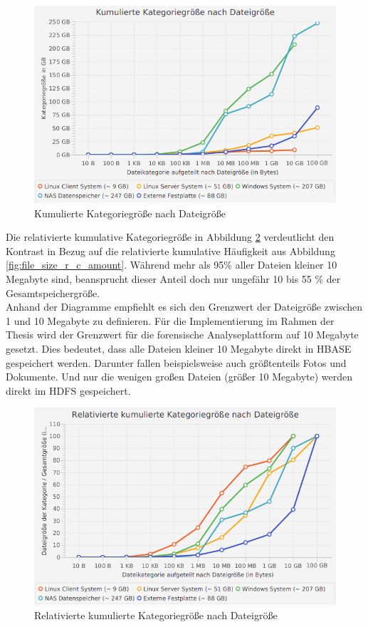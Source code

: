  \begin{figure}[ht]
  \centering
  \includegraphics[width=\textwidth]{./resource/fileSize_cumulatedCategorieSize.png}
  \caption{Kumulierte Kategoriegröße nach Dateigröße}
  \label{fig:file_size_c_file_size}
\end{figure}

\noindent
Die relativierte kumulative Kategoriegröße in Abbildung \ref{fig:file_size_r_c_file_size} verdeutlicht den Kontrast in Bezug auf die relativierte kumulative Häufigkeit aus Abbildung \ref{fig:file_size_r_c_amount}. Während mehr als 95\% aller Dateien kleiner 10 Megabyte sind, beansprucht dieser Anteil doch nur ungefähr 10 bis 55 \% der Gesamtspeichergröße.\\

\noindent
Anhand der Diagramme empfiehlt es sich den Grenzwert der Dateigröße zwischen 1 und 10 Megabyte zu definieren. Für die Implementierung im Rahmen der Thesis wird der Grenzwert für die forensische Analyseplattform auf 10 Megabyte gesetzt. Dies bedeutet, dass alle Dateien kleiner 10 Megabyte direkt in HBASE gespeichert werden. Darunter fallen beispielsweise auch größtenteils Fotos und Dokumente. Und nur die wenigen großen Dateien (größer 10 Megabyte) werden direkt im HDFS gespeichert.  

 \begin{figure}[ht]
  \centering
  \includegraphics[width=\textwidth]{./resource/fileSize_relativeCumulatedCategorieSize.png}
  \caption{Relativierte kumulierte Kategoriegröße nach Dateigröße}
  \label{fig:file_size_r_c_file_size}
\end{figure}

